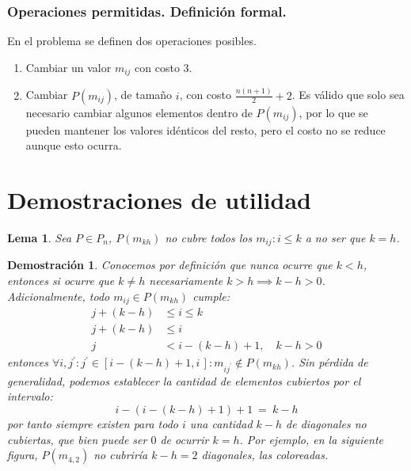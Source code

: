 \documentclass{article}
\theoremstyle{default}
\newtheorem*{lemma}{Lema}
\newtheorem*{demonstration}{Demostración}
\begin{document}
		\subsubsection{Operaciones permitidas. Definición formal.}
			En el problema se definen dos operaciones posibles.
			\begin{enumerate}
				\item Cambiar un valor $m_{ij}$ con costo $3$.
				\item Cambiar $P(m_{ij})$, de tamaño $i$, con costo $\frac{n(n+1)}{2} + 2$. Es válido que solo sea necesario cambiar algunos elementos dentro de $P(m_{ij})$, por lo que se pueden mantener los valores idénticos del resto, pero el costo no se reduce aunque esto ocurra.
			\end{enumerate}
\section{Demostraciones de utilidad}
	\begin{lemma}
		Sea $P \in P_{n}$, $P(m_{kh})$ no cubre todos los $m_{ij}: i \leq k$ a no ser que $k = h$.
	\end{lemma}
	\begin{demonstration}
		Conocemos por definición que nunca ocurre que $k < h$, entonces si ocurre que $k \neq h$ necesariamente $k > h \implies k - h > 0$. Adicionalmente, todo $m_{ij} \in P(m_{kh})$ cumple:
		\begin{align*}
			j + (k-h) &\leq i \leq k				\\
			j + (k-h) &\leq i						\\
			j 		  &< 	i - (k-h) + 1, \quad k-h > 0
		\end{align*}
		entonces $\forall i,j^\prime: j^\prime \in [i - (k-h) + 1, i\,]: m_{ij^\prime} \notin P(m_{kh})$. Sin pérdida de generalidad, podemos establecer la cantidad de elementos cubiertos por el intervalo:
		\[
			i - (i - (k-h) + 1) + 1 \ = \ k - h
		\]
		por tanto siempre existen para todo $i$ una cantidad $k - h$ de diagonales no cubiertas, que bien puede ser $0$ de ocurrir $k = h$. Por ejemplo, en la siguiente figura, $P(m_{4,2})$ no cubriría $k-h=2$ diagonales, las coloreadas.
		\begin{center}
		\end{center}
	\end{demonstration}
\end{document}
